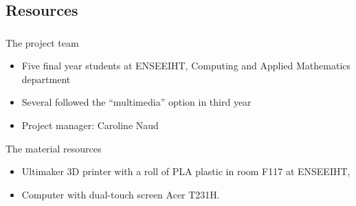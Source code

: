 \documentclass{beamer}
\begin{document}
\subsection{Resources}
\begin{frame}
	\frametitle{}
	
	\begin{block}{The project team}
		\begin{itemize}
		\item Five final year students at ENSEEIHT, Computing and Applied Mathematics department
		\item Several followed the “multimedia” option in third year
		\item Project manager: Caroline Naud
		\end{itemize}
    \end{block}
    
    \begin{block}{The material resources}
    	\begin{itemize}
    	\item Ultimaker 3D printer with a roll of PLA plastic in room F117 at ENSEEIHT,
    	\item Computer with dual-touch screen Acer T231H.
		\end{itemize}
    \end{block}
      
\end{frame}
\end{document}
